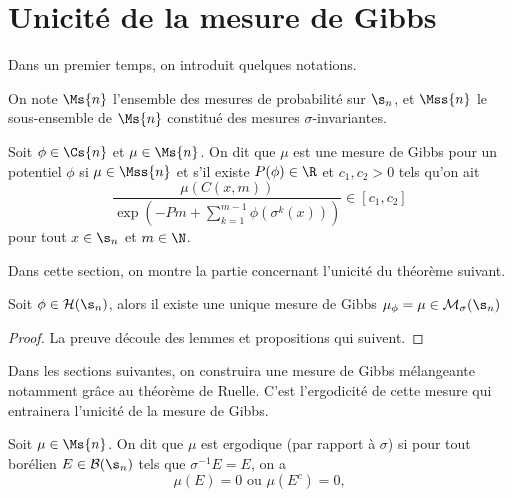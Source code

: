 \section{Unicité de la mesure de Gibbs}

  Dans un premier temps, on introduit quelques notations.

  \begin{definition}
    \label{def:meas_set}
    \leanok
    On note $\Ms{n}$ l'ensemble des mesures de probabilité sur $\s_n$, et $\Mss{n}$ le sous-ensemble de $\Ms{n}$
    constitué des mesures $\sigma$-invariantes.
  \end{definition}

  \begin{definition}
    \label{def:gibbs_meas}
    \leanok
    Soit $\phi \in \Cs{n}$ et $\mu \in \Ms{n}$.
    On dit que $\mu$ est une mesure de Gibbs pour un potentiel $\phi$ si $\mu \in \Mss{n}$ et s'il existe $P(\phi) \in \R$ et $c_1, c_2 > 0$ tels qu'on ait
    $$\frac{\mu(C(x, m))}{\exp(-Pm + \sum_{k=1}^{m-1}{\phi(\sigma^k(x))})} \in [c_1, c_2]$$
    pour tout $x \in \s_n$ et $m \in \N$.
  \end{definition}

  Dans cette section, on montre la partie concernant l'unicité du théorème suivant.

  \begin{theorem}
    \label{thm:gibbs}
    \leanok
    Soit $\phi \in \mathcal H(\s_n)$, alors il existe une unique mesure de Gibbs $\mu_{\phi} = \mu \in \mathcal M_{\sigma}(\s_n)$
  \end{theorem}

  \begin{proof}
    \leanok
    La preuve découle des lemmes et propositions qui suivent.
  \end{proof}

  Dans les sections suivantes, on construira une mesure de Gibbs mélangeante notamment grâce au théorème de Ruelle.
  C'est l'ergodicité de cette mesure qui entrainera l'unicité de la mesure de Gibbs.

  \begin{definition}
    \label{def:ergodique}
    \leanok
    Soit $\mu \in \Ms{n}$.
    On dit que $\mu$ est ergodique (par rapport à $\sigma$) si pour tout borélien $E \in \mathcal{B}(\s_n)$ tels que $\sigma^{-1}E=E$, on a
	$$\mu(E) = 0 \text{ ou } \mu(E^c) = 0,$$
  \end{definition}

